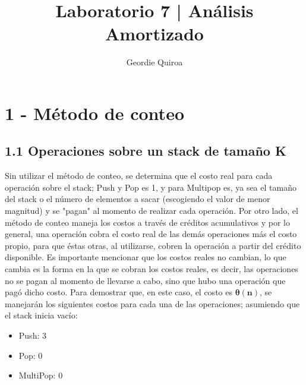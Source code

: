 \documentclass[10pt, letter]{report}
\title{	Laboratorio 7 | Análisis Amortizado}
\author{Geordie Quiroa}
\begin{document}
\maketitle

\section*{1 - Método de conteo}
\subsection*{1.1 Operaciones sobre un stack de tamaño K}
Sin utilizar el método de conteo, se determina que el costo real para cada operación sobre el stack; Push y Pop es 1, y para Multipop es, ya sea el tamaño del stack o el número de elementos a sacar (escogiendo el valor de menor magnitud) y se "pagan" al momento de realizar cada operación. Por otro lado, el método de conteo maneja los costos a través de créditos acumulativos y por lo general, una operación cobra el costo real de las demás operaciones más el costo propio, para que éstas otras, al utilizarse, cobren la operación a partir del crédito disponible. Es importante mencionar que los costos reales no cambian, lo que cambia es la forma en la que se cobran los costos reales, es decir, las operaciones no se pagan al momento de llevarse a cabo, sino que hubo una operación que pagó dicho costo. Para demostrar que, en este caso, el costo es $\mathbf{\theta(n)}$, se manejarán los siguientes costos para cada una de las operaciones; asumiendo que el stack inicia vacío: 
\begin{itemize}
	\item Push: 3
	\item Pop: 0
	\item MultiPop: 0
\end{itemize} ~\\
\end{document}
